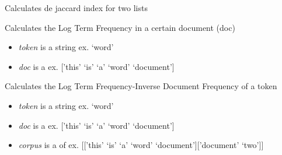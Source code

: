 \documentclass[letterpaper,10pt,english]{sphinxmanual}
\begin{document}

\begin{fulllineitems}
\label{theseus:theseus.processor.theseus.jaccard}
Calculates de jaccard index for two lists

\end{fulllineitems}


\begin{fulllineitems}
\label{theseus:theseus.processor.theseus.logtf}
Calculates the Log Term Frequency in a certain document (doc)
\begin{itemize}
\item {} 
\emph{token} is a string   ex. `word'

\item {} 
\emph{doc} is a      ex. {[}'this' `is' `a' `word' `document'{]}

\end{itemize}

\end{fulllineitems}


\begin{fulllineitems}
\label{theseus:theseus.processor.theseus.logtfidf}
Calculates the Log Term Frequency-Inverse Document Frequency of a token
\begin{itemize}
\item {} 
\emph{token} is a string               ex. `word'

\item {} 
\emph{doc} is a                  ex. {[}'this' `is' `a' `word' `document'{]}

\item {} 
\emph{corpus} is a  of     ex. {[}{[}'this' `is' `a' `word' `document'{]}{[}'document' `two'{]}{]}

\end{itemize}

\end{fulllineitems}
\end{document}
